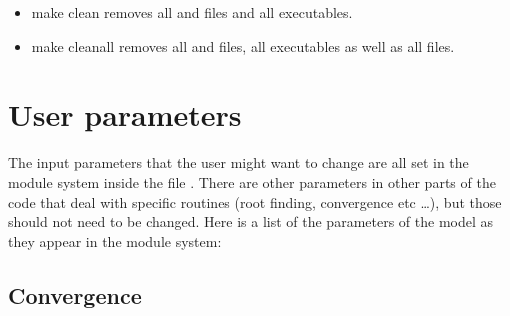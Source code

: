 \documentclass[letterpaper,10pt,english]{sphinxmanual}
\begin{document}
\begin{itemize}
\begin{sphinxVerbatim}[commandchars=\\\{\}]
makecleanmakeparspacempirun\PYGZhy{}nNUMBER\PYGZus{}OF\PYGZus{}PROCESSES./XNS\PYGZhy{}mpi
\end{sphinxVerbatim}

\sphinxAtStartPar
Note that it must be NUMBER\_OF\_PROCESSES\(\geq\)2, because one process is always only passing initial conditions to the other processes, and NUMBER\_OF\_PROCESSES\sphinxhyphen{}1\(\leq\)(NOMG+1)\(\times\)(NRHO1+1)\(\times\)(NKB+1), that is the number of computing processes must not be larger than the number of models to be computed.


\item {} 
\sphinxAtStartPar
make clean \sphinxhyphen{} removes all  and  files and all executables.


\item {} 
\sphinxAtStartPar
make cleanall \sphinxhyphen{} removes all  and  files, all executables as well as all  files.

\end{itemize}

\sphinxstepscope


\chapter{User parameters}
\label{\detokenize{user_params:user-parameters}}\label{\detokenize{user_params::doc}}
\sphinxAtStartPar
The input parameters that the user might want to change are all set in the module system inside the file . There are other parameters in other parts of the code that deal with specific routines (root finding, convergence etc …), but those should not need to be changed. Here is a list of the parameters of the model as they appear in the module system:


\section{Convergence}
\label{\detokenize{user_params:convergence}}
\end{document}

